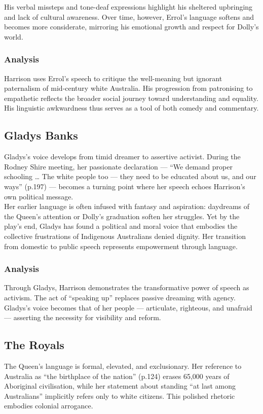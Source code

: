 \documentclass[a4paper]{article}
\begin{document}
His verbal missteps and tone-deaf expressions highlight his sheltered upbringing and lack of cultural awareness. Over time, however, Errol’s language softens and becomes more considerate, mirroring his emotional growth and respect for Dolly’s world.\\

\subsubsection{Analysis}
Harrison uses Errol’s speech to critique the well-meaning but ignorant paternalism of mid-century white Australia. His progression from patronising to empathetic reflects the broader social journey toward understanding and equality. His linguistic awkwardness thus serves as a tool of both comedy and commentary.\\



\subsection{Gladys Banks}
Gladys’s voice develops from timid dreamer to assertive activist. During the Rodney Shire meeting, her passionate declaration — “We demand proper schooling … The white people too — they need to be educated about us, and our ways” (p.197) — becomes a turning point where her speech echoes Harrison’s own political message.\\

Her earlier language is often infused with fantasy and aspiration: daydreams of the Queen’s attention or Dolly’s graduation soften her struggles. Yet by the play’s end, Gladys has found a political and moral voice that embodies the collective frustrations of Indigenous Australians denied dignity. Her transition from domestic to public speech represents empowerment through language.\\

\subsubsection{Analysis}
Through Gladys, Harrison demonstrates the transformative power of speech as activism. The act of “speaking up” replaces passive dreaming with agency. Gladys’s voice becomes that of her people — articulate, righteous, and unafraid — asserting the necessity for visibility and reform.\\


\subsection{The Royals}
The Queen’s language is formal, elevated, and exclusionary. Her reference to Australia as “the birthplace of the nation” (p.124) erases 65,000 years of Aboriginal civilisation, while her statement about standing “at last among Australians” implicitly refers only to white citizens. This polished rhetoric embodies colonial arrogance.\\
\end{document}
